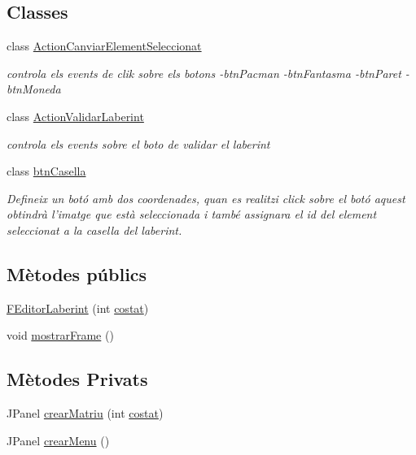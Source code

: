 \subsection*{Classes}
\begin{DoxyCompactItemize}
\item 
class \hyperlink{classinterficie_1_1_f_editor_laberint_1_1_action_canviar_element_seleccionat}{Action\+Canviar\+Element\+Seleccionat}
\begin{DoxyCompactList}\small\item\em controla els events de clik sobre els botons -\/btn\+Pacman -\/btn\+Fantasma -\/btn\+Paret -\/btn\+Moneda \end{DoxyCompactList}\item 
class \hyperlink{classinterficie_1_1_f_editor_laberint_1_1_action_validar_laberint}{Action\+Validar\+Laberint}
\begin{DoxyCompactList}\small\item\em controla els events sobre el boto de validar el laberint \end{DoxyCompactList}\item 
class \hyperlink{classinterficie_1_1_f_editor_laberint_1_1btn_casella}{btn\+Casella}
\begin{DoxyCompactList}\small\item\em Defineix un botó amb dos coordenades, quan es realitzi click sobre el botó aquest obtindrà l'imatge que està seleccionada i també assignara el id del element seleccionat a la casella del laberint. \end{DoxyCompactList}\end{DoxyCompactItemize}
\subsection*{Mètodes públics}
\begin{DoxyCompactItemize}
\item 
\hyperlink{classinterficie_1_1_f_editor_laberint_a1a43698ec96d8c97972115436bdfecea}{F\+Editor\+Laberint} (int \hyperlink{classinterficie_1_1_f_editor_laberint_a8715aa165dbd6c01e0f4470a4b11fca6}{costat})
\item 
void \hyperlink{classinterficie_1_1_f_editor_laberint_a086984e576ea2a896cd286d6b5a0b2b7}{mostrar\+Frame} ()
\end{DoxyCompactItemize}
\subsection*{Mètodes Privats}
\begin{DoxyCompactItemize}
\item 
J\+Panel \hyperlink{classinterficie_1_1_f_editor_laberint_a4cf31868202875a1b711982c7c8ecc8f}{crear\+Matriu} (int \hyperlink{classinterficie_1_1_f_editor_laberint_a8715aa165dbd6c01e0f4470a4b11fca6}{costat})
\item 
J\+Panel \hyperlink{classinterficie_1_1_f_editor_laberint_a90b765b7d6bedccdfc6573ab74f34019}{crear\+Menu} ()
\end{DoxyCompactItemize}
